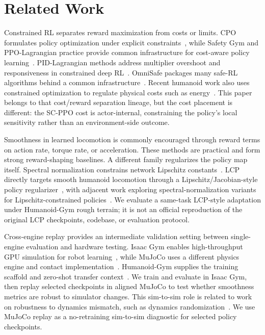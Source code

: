 \documentclass[10pt]{article}
\begin{document}
\section{Related Work}

Constrained RL separates reward maximization from costs or limits. CPO
formulates policy optimization under explicit constraints~\citep{Achiam2017CPO},
while Safety Gym and PPO-Lagrangian practice provide common infrastructure for
cost-aware policy learning~\citep{Ray2019SafetyGym}. PID-Lagrangian methods
address multiplier overshoot and responsiveness in constrained deep
RL~\citep{Stooke2020PID}. OmniSafe packages many safe-RL algorithms behind a
common infrastructure~\citep{Ji2024OmniSafe}. Recent humanoid work also uses
constrained optimization to regulate physical costs such as
energy~\citep{Huang2026ECO}. This paper belongs to that cost/reward separation
lineage, but the cost placement is different: the SC-PPO cost is
actor-internal, constraining the policy's local sensitivity rather than an
environment-side outcome.

Smoothness in learned locomotion is commonly encouraged through reward terms on
action rate, torque rate, or acceleration. These methods are practical and form
strong reward-shaping baselines. A different family regularizes the policy map
itself. Spectral normalization constrains network Lipschitz
constants~\citep{Miyato2018SN}. LCP directly targets smooth humanoid
locomotion through a Lipschitz/Jacobian-style policy
regularizer~\citep{Chen2024LCP}, with adjacent work exploring spectral-normalization
variants for Lipschitz-constrained policies~\citep{Shin2025SNLCP}. We evaluate
a same-task LCP-style adaptation under Humanoid-Gym rough terrain; it is not an
official reproduction of the original LCP checkpoints, codebase, or evaluation
protocol.

Cross-engine replay provides an intermediate validation setting between
single-engine evaluation and hardware testing. Isaac Gym enables high-throughput
GPU simulation for robot learning~\citep{Makoviychuk2021IsaacGym}, while MuJoCo
uses a different physics engine and contact implementation~\citep{Todorov2012MuJoCo}.
Humanoid-Gym supplies the training scaffold and zero-shot transfer
context~\citep{Gu2024HumanoidGym}. We train and evaluate in Isaac Gym, then
replay selected checkpoints in aligned MuJoCo to test whether smoothness metrics
are robust to simulator changes. This sim-to-sim role is related to work on
robustness to dynamics mismatch, such as dynamics
randomization~\citep{Peng2018DynamicsRandomization}. We use MuJoCo replay as a
no-retraining sim-to-sim diagnostic for selected policy checkpoints.
\end{document}
